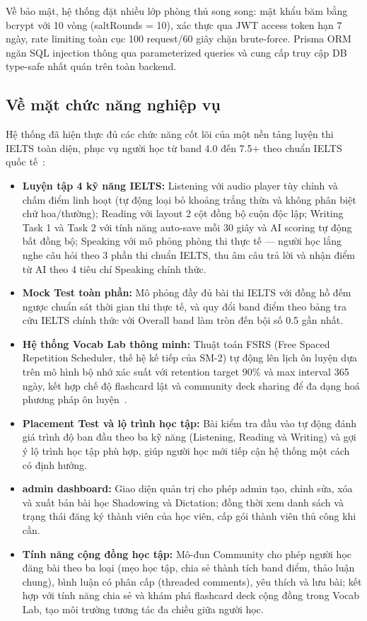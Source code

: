 Về bảo mật, hệ thống đặt nhiều lớp phòng thủ song song: mật khẩu băm bằng bcrypt với 10 vòng (saltRounds = 10), xác thực qua JWT access token hạn 7 ngày, rate limiting toàn cục 100 request/60 giây chặn brute-force. Prisma ORM~\cite{prisma-docs} ngăn SQL injection thông qua parameterized queries và cung cấp truy cập DB type-safe nhất quán trên toàn backend.

\subsection{Về mặt chức năng nghiệp vụ}

Hệ thống đã hiện thực đủ các chức năng cốt lõi của một nền tảng luyện thi IELTS toàn diện, phục vụ người học từ band 4.0 đến 7.5+ theo chuẩn IELTS quốc tế~\cite{ielts-global-stats}:

\begin{itemize}
    \item \textbf{Luyện tập 4 kỹ năng IELTS:} Listening với audio player tùy chỉnh và chấm điểm linh hoạt (tự động loại bỏ khoảng trắng thừa và không phân biệt chữ hoa/thường); Reading với layout 2 cột đồng bộ cuộn độc lập; Writing Task 1 và Task 2 với tính năng auto-save mỗi 30 giây và AI scoring tự động bất đồng bộ; Speaking với mô phỏng phòng thi thực tế --- người học lắng nghe câu hỏi theo 3 phần thi chuẩn IELTS, thu âm câu trả lời và nhận điểm từ AI theo 4 tiêu chí Speaking chính thức.

    \item \textbf{Mock Test toàn phần:} Mô phỏng đầy đủ bài thi IELTS với đồng hồ đếm ngược chuẩn sát thời gian thi thực tế, và quy đổi band điểm theo bảng tra cứu IELTS chính thức với Overall band làm tròn đến bội số 0.5 gần nhất.

    \item \textbf{Hệ thống Vocab Lab thông minh:} Thuật toán FSRS (Free Spaced Repetition Scheduler, thế hệ kế tiếp của SM-2) tự động lên lịch ôn luyện dựa trên mô hình bộ nhớ xác suất với retention target 90\% và max interval 365 ngày, kết hợp chế độ flashcard lật và community deck sharing để đa dạng hoá phương pháp ôn luyện~\cite{ye2022fsrs}.

    \item \textbf{Placement Test và lộ trình học tập:} Bài kiểm tra đầu vào tự động đánh giá trình độ ban đầu theo ba kỹ năng (Listening, Reading và Writing) và gợi ý lộ trình học tập phù hợp, giúp người học mới tiếp cận hệ thống một cách có định hướng.

    \item \textbf{admin dashboard:} Giao diện quản trị cho phép admin tạo, chỉnh sửa, xóa và xuất bản bài học Shadowing và Dictation; đồng thời xem danh sách và trạng thái đăng ký thành viên của học viên, cấp gói thành viên thủ công khi cần.

    \item \textbf{Tính năng cộng đồng học tập:} Mô-đun Community cho phép người học đăng bài theo ba loại (mẹo học tập, chia sẻ thành tích band điểm, thảo luận chung), bình luận có phân cấp (threaded comments), yêu thích và lưu bài; kết hợp với tính năng chia sẻ và khám phá flashcard deck cộng đồng trong Vocab Lab, tạo môi trường tương tác đa chiều giữa người học.
\end{itemize}

